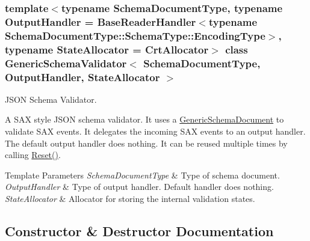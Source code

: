 \subsubsection*{template$<$typename Schema\+Document\+Type, typename Output\+Handler = Base\+Reader\+Handler$<$typename Schema\+Document\+Type\+::\+Schema\+Type\+::\+Encoding\+Type$>$, typename State\+Allocator = Crt\+Allocator$>$\newline
class Generic\+Schema\+Validator$<$ Schema\+Document\+Type, Output\+Handler, State\+Allocator $>$}

J\+S\+ON Schema Validator. 

A S\+AX style J\+S\+ON schema validator. It uses a {\ttfamily \hyperlink{class_generic_schema_document}{Generic\+Schema\+Document}} to validate S\+AX events. It delegates the incoming S\+AX events to an output handler. The default output handler does nothing. It can be reused multiple times by calling {\ttfamily \hyperlink{class_generic_schema_validator_a49efbbe098cb77728be3d48cafed17e4}{Reset()}}.


\begin{DoxyTemplParams}{Template Parameters}
{\em Schema\+Document\+Type} & Type of schema document. \\
\hline
{\em Output\+Handler} & Type of output handler. Default handler does nothing. \\
\hline
{\em State\+Allocator} & Allocator for storing the internal validation states. \\
\hline
\end{DoxyTemplParams}


\subsection{Constructor \& Destructor Documentation}
\mbox{\label{class_generic_schema_validator_a202ee6fdbe5ae9eab3e77a81ecdfeb6d}} 

